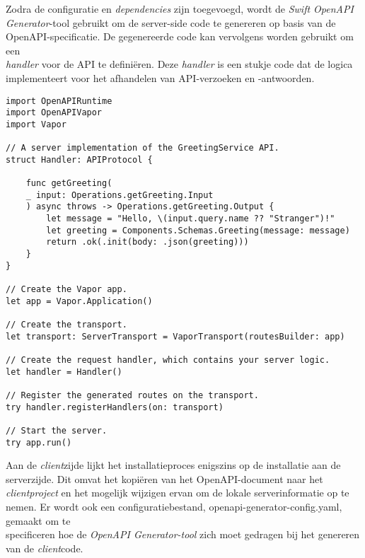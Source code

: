 Zodra de configuratie en \textit{dependencies} zijn toegevoegd, wordt de \textit{Swift OpenAPI Generator}-tool gebruikt om de server-side code te genereren op basis van de OpenAPI-specificatie. De gegenereerde code kan vervolgens worden gebruikt om een \\ \textit{handler} voor de API te definiëren. Deze \textit{handler} is een stukje code dat de logica implementeert voor het afhandelen van API-verzoeken en -antwoorden. 

\begin{lstlisting}[caption=Using generated API Server Stubs]
import OpenAPIRuntime
import OpenAPIVapor
import Vapor

// A server implementation of the GreetingService API.
struct Handler: APIProtocol {
    
    func getGreeting(
    _ input: Operations.getGreeting.Input
    ) async throws -> Operations.getGreeting.Output {
        let message = "Hello, \(input.query.name ?? "Stranger")!"
        let greeting = Components.Schemas.Greeting(message: message)
        return .ok(.init(body: .json(greeting)))
    }
}

// Create the Vapor app.
let app = Vapor.Application()

// Create the transport.
let transport: ServerTransport = VaporTransport(routesBuilder: app)

// Create the request handler, which contains your server logic.
let handler = Handler()

// Register the generated routes on the transport.
try handler.registerHandlers(on: transport)

// Start the server.
try app.run()
\end{lstlisting}

Aan de \textit{client}zijde lijkt het installatieproces enigszins op de installatie aan de serverzijde. Dit omvat het kopiëren van het OpenAPI-document naar het \textit{clientproject} en het mogelijk wijzigen ervan om de lokale serverinformatie op te nemen. Er wordt ook een configuratiebestand, openapi-generator-config.yaml, gemaakt om te \\specificeren hoe de \textit{OpenAPI Generator-tool} zich moet gedragen bij het genereren van de \textit{client}code.

